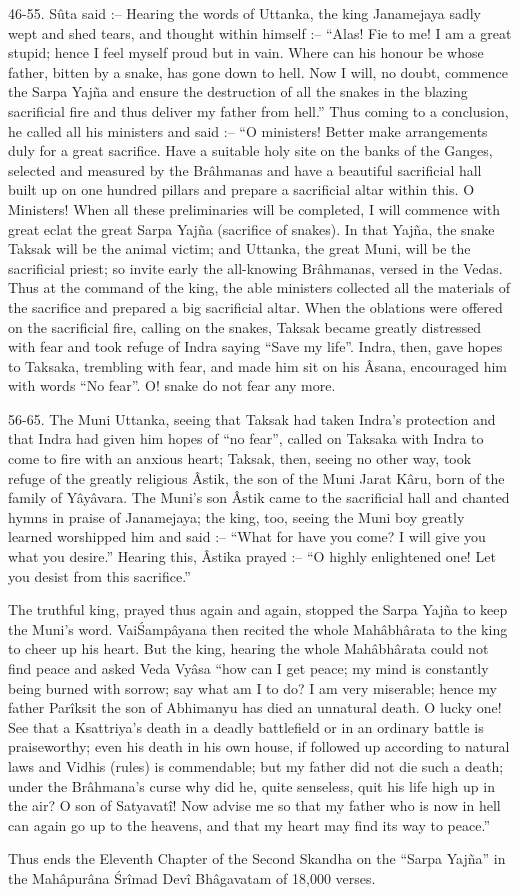 46-55. S\^uta said :-- Hearing the words of Uttanka, the king Janamejaya sadly wept and shed tears, and thought within himself :-- ``Alas! Fie to me! I am a great stupid; hence I feel myself proud but in vain. Where can his honour be whose father, bitten by a snake, has gone down to hell. Now I will, no doubt, commence the Sarpa Yaj\~na and ensure the destruction of all the snakes in the blazing sacrificial fire and thus deliver my father from hell.'' Thus coming to a conclusion, he called all his ministers and said :-- ``O ministers! Better make arrangements duly for a great sacrifice. Have a suitable holy site on the banks of the Ganges, selected and measured by the Br\^ahmanas and have a beautiful sacrificial hall built up on one hundred pillars and prepare a sacrificial altar within this. O Ministers! When all these preliminaries will be completed, I will commence with great eclat the great Sarpa Yaj\~na (sacrifice of snakes). In that Yaj\~na, the snake Taksak will be the animal victim; and Uttanka, the great Muni, will be the sacrificial priest; so invite early the all-knowing Br\^ahmanas, versed in the Vedas. Thus at the command of the king, the able ministers collected all the materials of the sacrifice and prepared a big sacrificial altar. When the oblations were offered on the sacrificial fire, calling on the snakes, Taksak became greatly distressed with fear and took refuge of Indra saying ``Save my life''. Indra, then, gave hopes to Taksaka, trembling with fear, and made him sit on his Âsana, encouraged him with words ``No fear''. O! snake do not fear any more.

56-65. The Muni Uttanka, seeing that Taksak had taken Indra's protection and that Indra had given him hopes of ``no fear'', called on Taksaka with Indra to come to fire with an anxious heart; Taksak, then, seeing no other way, took refuge of the greatly religious Âstik, the son of the Muni Jarat K\^aru, born of the family of Y\^ay\^avara. The Muni's son Âstik came to the sacrificial hall and chanted hymns in praise of Janamejaya; the king, too, seeing the Muni boy greatly learned worshipped him and said :-- ``What for have you come? I will give you what you desire.'' Hearing this, Âstika prayed :-- ``O highly enlightened one! Let you desist from this sacrifice.''

The truthful king, prayed thus again and again, stopped the Sarpa Yaj\~na to keep the Muni's word. Vai\'Samp\^ayana then recited the whole Mah\^abh\^arata to the king to cheer up his heart. But the king, hearing the whole Mah\^abh\^arata could not find peace and asked Veda Vy\^asa ``how can I get peace; my mind is constantly being burned with sorrow; say what am I to do? I am very miserable; hence my father Par\^iksit the son of Abhimanyu has died an unnatural death. O lucky one! See that a Ksattriya's death in a deadly battlefield or in an ordinary battle is praiseworthy; even his death in his own house, if followed up according to natural laws and Vidhis (rules) is commendable; but my father did not die such a death; under the Br\^ahmana's curse why did he, quite senseless, quit his life high up in the air? O son of Satyavat\^i! Now advise me so that my father who is now in hell can again go up to the heavens, and that my heart may find its way to peace.''

Thus ends the Eleventh Chapter of the Second Skandha on the ``Sarpa Yaj\~na'' in the Mah\^apur\^ana \'Sr\^imad Dev\^i Bh\^agavatam of 18,000 verses.